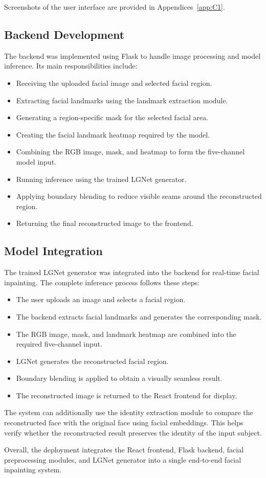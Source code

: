 \noindent Screenshots of the user interface are provided in
Appendices~\ref{app:C1}.

\subsection{Backend Development}

The backend was implemented using Flask to handle image processing and model
inference. Its main responsibilities include:

\begin{itemize}
    \item Receiving the uploaded facial image and selected facial region.
    \item Extracting facial landmarks using the landmark extraction module.
    \item Generating a region-specific mask for the selected facial area.
    \item Creating the facial landmark heatmap required by the model.
    \item Combining the RGB image, mask, and heatmap to form the five-channel
    model input.
    \item Running inference using the trained LGNet generator.
    \item Applying boundary blending to reduce visible seams around the
    reconstructed region.
    \item Returning the final reconstructed image to the frontend.
\end{itemize}

\subsection{Model Integration}

The trained LGNet generator was integrated into the backend for real-time
facial inpainting. The complete inference process follows these steps:

\begin{itemize}
    \item The user uploads an image and selects a facial region.
    \item The backend extracts facial landmarks and generates the corresponding mask.
    \item The RGB image, mask, and landmark heatmap are combined into the
    required five-channel input.
    \item LGNet generates the reconstructed facial region.
    \item Boundary blending is applied to obtain a visually seamless result.
    \item The reconstructed image is returned to the React frontend for display.
\end{itemize}

\noindent The system can additionally use the identity extraction module to
compare the reconstructed face with the original face using facial embeddings.
This helps verify whether the reconstructed result preserves the identity of
the input subject.

\noindent Overall, the deployment integrates the React frontend, Flask backend,
facial preprocessing modules, and LGNet generator into a single end-to-end
facial inpainting system.